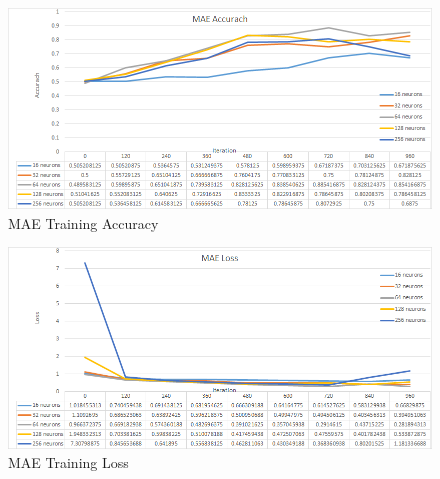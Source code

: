 \documentclass[draft,dvipsnames]{drexel-thesis}
\begin{document}
\begin{thesis}
\begin{figure}[t!]
    \centering
    \includegraphics[width=\textwidth]{pictures/result_pictures/MAE_Accuracy.png}
    \caption{MAE Training Accuracy}
    \label{fig:mae_accuracy}
\end{figure}

\begin{figure}[t!]
    \centering
    \includegraphics[width=\textwidth]{pictures/result_pictures/MAE_Loss.png}
    \caption{MAE Training Loss}
    \label{fig:mae_loss}
\end{figure}


\end{thesis}
\end{document}

